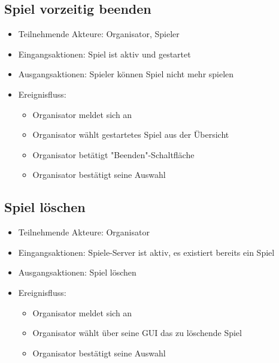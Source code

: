 \documentclass[a4paper]{scrreprt}
\begin{document}
    \subsection{Spiel vorzeitig beenden}
    \begin{itemize}
        \item Teilnehmende Akteure: \Gls{Organisator}, \Gls{Spieler}
        \item Eingangsaktionen: Spiel ist aktiv und gestartet
        \item Ausgangsaktionen: \Gls{Spieler} können Spiel nicht mehr spielen %
        \item Ereignisfluss:
        \begin{itemize}
            \item \Gls{Organisator} meldet sich an
            \item \Gls{Organisator} wählt gestartetes Spiel aus der Übersicht
            \item \Gls{Organisator} betätigt "Beenden"-Schaltfläche
            \item \Gls{Organisator} bestätigt seine Auswahl
        \end{itemize}
    \end{itemize}

    \subsection{Spiel löschen}
    \begin{itemize}
        \item Teilnehmende Akteure: \Gls{Organisator}
        \item Eingangsaktionen: Spiele-Server ist aktiv, es existiert bereits ein Spiel
        \item Ausgangsaktionen: Spiel löschen
        \item Ereignisfluss:
        \begin{itemize}
            \item \Gls{Organisator} meldet sich an
            \item \Gls{Organisator} wählt über seine GUI das zu löschende Spiel
            \item \Gls{Organisator} bestätigt seine Auswahl
        \end{itemize}
    \end{itemize}
\end{document}
